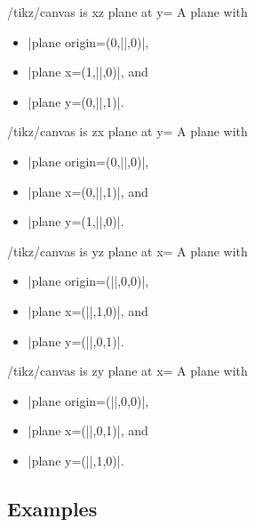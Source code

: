 \begin{key}{/tikz/canvas is xz plane at y=}
    A plane with
    \begin{itemize}
        \item |plane origin={(0,||,0)}|,
        \item |plane x={(1,||,0)}|, and
        \item |plane y={(0,||,1)}|.
    \end{itemize}
\end{key}

\begin{key}{/tikz/canvas is zx plane at y=}
    A plane with
    \begin{itemize}
        \item |plane origin={(0,||,0)}|,
        \item |plane x={(0,||,1)}|, and
        \item |plane y={(1,||,0)}|.
    \end{itemize}
\end{key}

\begin{key}{/tikz/canvas is yz plane at x=}
    A plane with
    \begin{itemize}
        \item |plane origin={(||,0,0)}|,
        \item |plane x={(||,1,0)}|, and
        \item |plane y={(||,0,1)}|.
    \end{itemize}
\end{key}

\begin{key}{/tikz/canvas is zy plane at x=}
    A plane with
    \begin{itemize}
        \item |plane origin={(||,0,0)}|,
        \item |plane x={(||,0,1)}|, and
        \item |plane y={(||,1,0)}|.
    \end{itemize}
\end{key}


\subsection{Examples}

